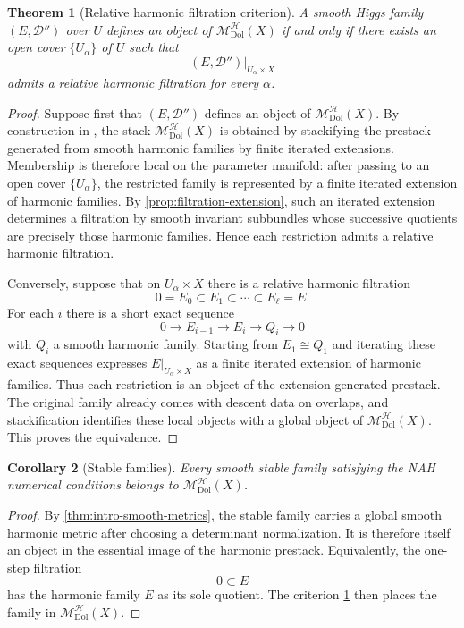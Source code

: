 \documentclass[11pt,reqno]{amsart}
\newtheorem{theorem}{Theorem}[section]
\newtheorem{corollary}[theorem]{Corollary}
\theoremstyle{definition}
\theoremstyle{remark}
\newcommand{\cD}{\mathcal D}
\newcommand{\cH}{\mathcal H}
\newcommand{\Dol}{\mathrm{Dol}}
\newcommand{\MHDol}{\mathscr M^{\cH}_{\Dol}}
\begin{document}
\begin{theorem}[Relative harmonic filtration criterion]\label{thm:filtration-criterion}
A smooth Higgs family $(E,\cD'')$ over $U$ defines an object of $\MHDol(X)$ if and only if there exists an open cover $\{U_\alpha\}$ of $U$ such that
\[
  (E,\cD'')|_{U_\alpha\times X}
\]
admits a relative harmonic filtration for every $\alpha$.
\end{theorem}

\begin{proof}
Suppose first that $(E,\cD'')$ defines an object of $\MHDol(X)$.  By construction in \cite{AzamRayan2026}, the stack $\MHDol(X)$ is obtained by stackifying the prestack generated from smooth harmonic families by finite iterated extensions.  Membership is therefore local on the parameter manifold: after passing to an open cover $\{U_\alpha\}$, the restricted family is represented by a finite iterated extension of harmonic families.  By \cref{prop:filtration-extension}, such an iterated extension determines a filtration by smooth invariant subbundles whose successive quotients are precisely those harmonic families.  Hence each restriction admits a relative harmonic filtration.

Conversely, suppose that on $U_\alpha\times X$ there is a relative harmonic filtration
\[
  0=E_0\subset E_1\subset\cdots\subset E_\ell=E.
\]
For each $i$ there is a short exact sequence
\[
  0\to E_{i-1}\to E_i\to Q_i\to0
\]
with $Q_i$ a smooth harmonic family.  Starting from $E_1\cong Q_1$ and iterating these exact sequences expresses $E|_{U_\alpha\times X}$ as a finite iterated extension of harmonic families.  Thus each restriction is an object of the extension-generated prestack.  The original family already comes with descent data on overlaps, and stackification identifies these local objects with a global object of $\MHDol(X)$.  This proves the equivalence.
\end{proof}

\begin{corollary}[Stable families]\label{cor:stable-filtration}
Every smooth stable family satisfying the NAH numerical conditions belongs to $\MHDol(X)$.
\end{corollary}

\begin{proof}
By \cref{thm:intro-smooth-metrics}, the stable family carries a global
smooth harmonic metric after choosing a determinant normalization.  It
is therefore itself an object in the essential image of the harmonic
prestack.  Equivalently, the one-step filtration
\[
  0\subset E
\]
has the harmonic family $E$ as its sole quotient.  The criterion
\cref{thm:filtration-criterion} then places the family in
$\MHDol(X)$.
\end{proof}
\end{document}
